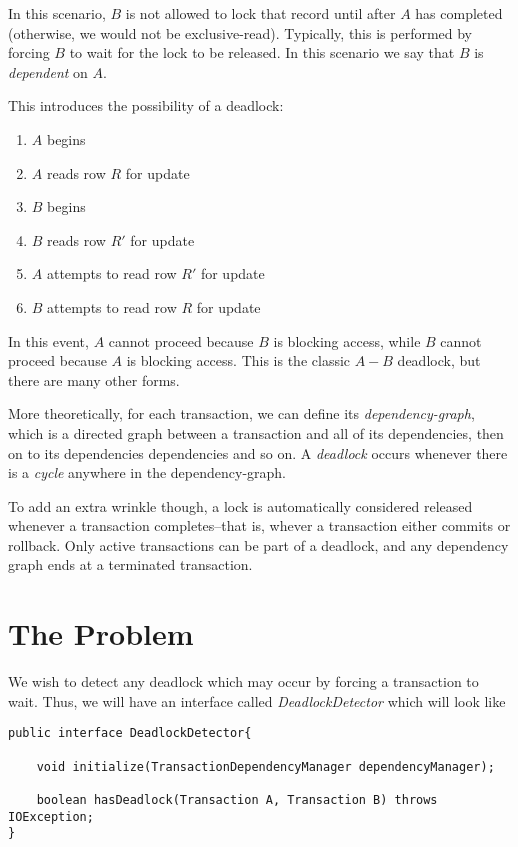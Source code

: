 \documentclass[11pt]{article}
\begin{document}
In this scenario, $B$ is not allowed to lock that record until after $A$ has completed (otherwise, we would not be exclusive-read). Typically, this is performed by forcing $B$ to wait for the lock to be released.  In this scenario we say that $B$ is \emph{dependent} on $A$.

This introduces the possibility of a deadlock:

\begin{enumerate}
				\item $A$ begins
				\item $A$ reads row $R$ for update
				\item $B$ begins
				\item $B$ reads row $R'$ for update
				\item $A$ attempts to read row $R'$ for update
				\item $B$ attempts to read row $R$ for update
\end{enumerate}

In this event, $A$ cannot proceed because $B$ is blocking access, while $B$ cannot proceed because $A$ is blocking access. This is the classic $A-B$ deadlock, but there are many other forms. 

More theoretically, for each transaction, we can define its \emph{dependency-graph}, which is a directed graph between a transaction and all of its dependencies, then on to its dependencies dependencies and so on. A \emph{deadlock} occurs whenever there is a \emph{cycle} anywhere in the dependency-graph.

To add an extra wrinkle though, a lock is automatically considered released whenever a transaction completes--that is, whever a transaction either commits or rollback. Only active transactions can be part of a deadlock, and any dependency graph ends at a terminated transaction.

\section{The Problem}
We wish to detect any deadlock which may occur by forcing a transaction to wait. Thus, we will have an interface called \emph{DeadlockDetector} which will look like

\begin{lstlisting}
public interface DeadlockDetector{

	void initialize(TransactionDependencyManager dependencyManager);

	boolean hasDeadlock(Transaction A, Transaction B) throws IOException;
}
\end{lstlisting}
\end{document}
